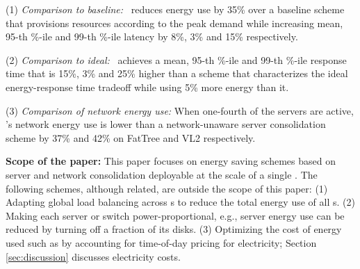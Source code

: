 (1) \emph{Comparison to baseline:}  \shrink\ reduces energy use by 35\% over a baseline scheme that provisions resources according to the peak demand while increasing mean, 95-th \%-ile and 99-th \%-ile latency by 8\%, 3\% and 15\% respectively. 

(2) \emph{Comparison to ideal:}  \shrink\ achieves a mean, 95-th \%-ile and 99-th \%-ile response time that is 15\%, 3\% and 25\% higher than a scheme that characterizes the ideal energy-response time tradeoff while using 5\% more energy than it.

(3) \emph{Comparison of network energy use:} When one-fourth of the servers are active, \shrink's network energy use is lower than a network-unaware server consolidation scheme by 37\% and 42\% on FatTree \cite{fattree} and VL2 \cite{vl2} respectively.

\textbf{Scope of the paper:} This paper focuses on energy saving schemes based on server and network consolidation deployable at the scale of a single \cdc. The following schemes, although related, are outside the scope of this paper: (1) Adapting global load balancing across \cdc s to reduce the total energy use of all \cdc s. (2) Making each server or switch power-proportional, e.g., server energy use can be reduced by turning off a fraction of its disks. (3) Optimizing the cost of energy used such as by accounting for time-of-day pricing for electricity; Section \ref{sec:discussion} discusses electricity costs.





